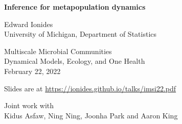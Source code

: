 \documentclass{beamer}
\begin{document}
\begin{frame}
  
\begin{center}
  {\Large\bf Inference for metapopulation dynamics}



\vspace{2mm}

Edward Ionides\\
University of Michigan, Department of Statistics

\vspace{8mm}

Multiscale Microbial Communities\\
Dynamical Models, Ecology, and One Health\\
February 22, 2022


\hspace{3mm}

Slides are at \url{https://ionides.github.io/talks/imsi22.pdf}

\vspace{8mm}

Joint work with\\
Kidus Asfaw, Ning Ning, Joonha Park and Aaron King

\end{center}

\end{frame}


\newcommand\challengeSep{\vspace{3mm}}
\end{document}
